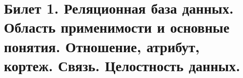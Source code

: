 \newpage
\section{Билет 1. Реляционная база данных. Область применимости и основные понятия. Отношение, атрибут, кортеж. Связь. Целостность данных.}